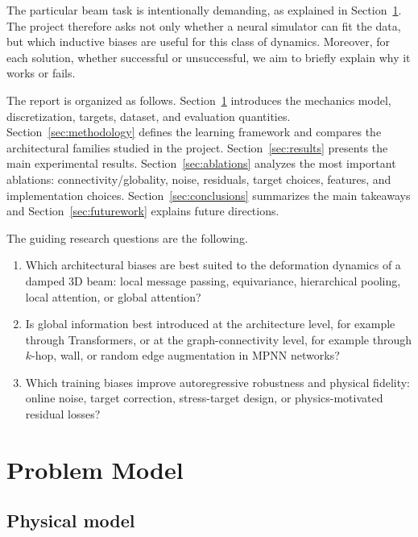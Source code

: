 \documentclass[11pt,a4paper,reqno]{amsart}
\theoremstyle{definition}
\theoremstyle{remark}
\numberwithin{equation}{section}
\begin{document}
The particular beam task is intentionally demanding, as explained in Section~\ref{sec:problem-model}. The project therefore asks not only whether a neural simulator can fit the data, but which inductive biases are useful for this class of dynamics. Moreover, for each solution, whether successful or unsuccessful, we aim to briefly explain why it works or fails.

The report is organized as follows. Section~\ref{sec:problem-model} introduces the mechanics model, discretization, targets, dataset, and evaluation quantities. Section~\ref{sec:methodology} defines the learning framework and compares the architectural families studied in the project. Section~\ref{sec:results} presents the main experimental results. Section~\ref{sec:ablations} analyzes the most important ablations: connectivity/globality, noise, residuals, target choices, features, and implementation choices. Section~\ref{sec:conclusions} summarizes the main takeaways and Section~\ref{sec:futurework} explains future directions.

The guiding research questions are the following.
\begin{enumerate}[label=\textbf{RQ\arabic*.}, leftmargin=2.2cm]
    \item Which architectural biases are best suited to the deformation dynamics of a damped 3D beam: local message passing, equivariance, hierarchical pooling, local attention, or global attention?
    \item Is global information best introduced at the architecture level, for example through Transformers, or at the graph-connectivity level, for example through $k$-hop, wall, or random edge augmentation in MPNN networks?
    \item Which training biases improve autoregressive robustness and physical fidelity: online noise, target correction, stress-target design, or physics-motivated residual losses?
\end{enumerate}

\section{Problem Model}\label{sec:problem-model}

\subsection{Physical model}
\end{document}
